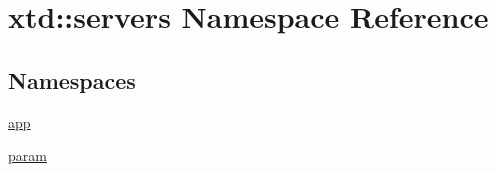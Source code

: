 \hypertarget{namespacextd_1_1servers}{\section{xtd\-:\-:servers Namespace Reference}
\label{namespacextd_1_1servers}
}
\subsection*{Namespaces}
\begin{DoxyCompactItemize}
\item 
\hyperlink{namespacextd_1_1servers_1_1app}{app}
\item 
\hyperlink{namespacextd_1_1servers_1_1param}{param}
\end{DoxyCompactItemize}
